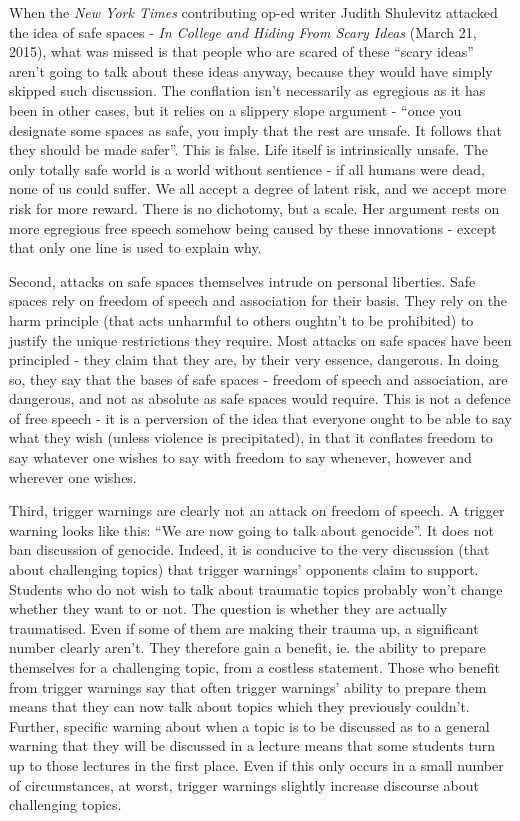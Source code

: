 \documentclass[10pt,a4paper,twoside]{article}
\begin{document}
\begin{multicols}{2}
When the \emph{New York Times} contributing op-ed writer Judith
Shulevitz attacked the idea of safe spaces - \emph{In College and Hiding
	From Scary Ideas} (March 21, 2015), what was missed is that people who
are scared of these ``scary ideas'' aren't going to talk about these
ideas anyway, because they would have simply skipped such discussion.
The conflation isn't necessarily as egregious as it has been in other
cases, but it relies on a slippery slope argument - ``once you designate
some spaces as safe, you imply that the rest are unsafe. It follows that
they should be made safer''. This is false. Life itself is intrinsically
unsafe. The only totally safe world is a world without sentience - if
all humans were dead, none of us could suffer. We all accept a degree of
latent risk, and we accept more risk for more reward. There is no
dichotomy, but a scale. Her argument rests on more egregious free speech
somehow being caused by these innovations - except that only one line is
used to explain why.

Second, attacks on safe spaces themselves intrude on personal liberties.
Safe spaces rely on freedom of speech and association for their basis.
They rely on the harm principle (that acts unharmful to others oughtn't
to be prohibited) to justify the unique restrictions they require. Most
attacks on safe spaces have been principled - they claim that they are,
by their very essence, dangerous. In doing so, they say that the bases
of safe spaces - freedom of speech and association, are dangerous, and
not as absolute as safe spaces would require. This is not a defence of
free speech - it is a perversion of the idea that everyone ought to be
able to say what they wish (unless violence is precipitated), in that it
conflates freedom to say whatever one wishes to say with freedom to say
whenever, however and wherever one wishes.

Third, trigger warnings are clearly not an attack on freedom of speech.
A trigger warning looks like this: ``We are now going to talk about
genocide''. It does not ban discussion of genocide. Indeed, it is
conducive to the very discussion (that about challenging topics) that
trigger warnings' opponents claim to support. Students who do not wish
to talk about traumatic topics probably won't change whether they want
to or not. The question is whether they are actually traumatised. Even
if some of them are making their trauma up, a significant number clearly
aren't. They therefore gain a benefit, ie. the ability to prepare
themselves for a challenging topic, from a costless statement. Those who
benefit from trigger warnings say that often trigger warnings' ability
to prepare them means that they can now talk about topics which they
previously couldn't. Further, specific warning about when a topic is to
be discussed as to a general warning that they will be discussed in a
lecture means that some students turn up to those lectures in the first
place. Even if this only occurs in a small number of circumstances, at
worst, trigger warnings slightly increase discourse about challenging
topics.


\end{multicols}
\end{document}
